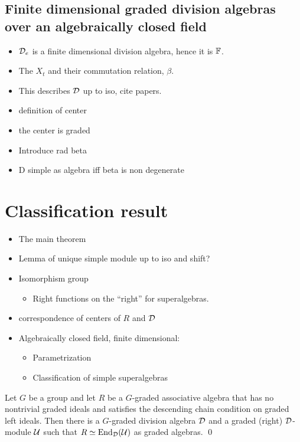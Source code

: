 \subsection{Finite dimensional graded division algebras over an algebraically closed field}

\begin{itemize}
    \item $\mathcal{D}_e$ is a finite dimensional division algebra, hence it is $\mathbb{F}$.
    \item The $X_t$ and their commutation relation, $\beta$.
    \item This describes $\mathcal{D}$ up to iso, cite papers.
    \item definition of center
    \item the center is graded
    \item Introduce rad beta
    \item D simple as algebra iff beta is non degenerate
\end{itemize}

\section{Classification result}

\begin{itemize}
    \item The main theorem
    \item Lemma of unique simple module up to iso and shift?
    \item Isomorphism group
    \begin{itemize}
        \item Right functions on the ``right'' for superalgebras.
    \end{itemize}
    \item correspondence of centers of $R$ and $\mathcal{D}$
    \item Algebraically closed field, finite dimensional:
    \begin{itemize}
        \item Parametrization
        \item Classification of simple superalgebras
    \end{itemize}
\end{itemize}


\begin{thm}\label{thm:End-over-D}
	Let $G$ be a group and let $R$ be a $G$-graded associative algebra that has no nontrivial graded ideals and satisfies the descending chain condition on
	graded left ideals.
	Then there is a $G$-graded division algebra $\mathcal{D}$ and a graded (right) $\mathcal{D}$-module $\mathcal U$ such that $R \simeq \operatorname{End}_{\mathcal{D}} (\mathcal U)$ as graded algebras. \qed
\end{thm}

